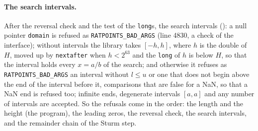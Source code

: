 \paragraph{The search intervals.} After the reversal check and the test of the \verb|long|s, the
search intervals (): a null pointer \verb|domain| is refused as
\verb|RATPOINTS_BAD_ARGS| (line 4830, a check of the interface); without intervals the library takes
$[-h, h]$, where $h$ is the double of $H$, moved up by \verb|nextafter| when $h < 2^{63}$ and the
\verb|long| of $h$ is below $H$, so that the interval holds every $x = a/b$ of the search; and
otherwise it refuses as \verb|RATPOINTS_BAD_ARGS| an interval without $l \le u$ or one that does not
begin above the end of the interval before it, comparisons that are false for a NaN, so that a NaN
end is refused too; infinite ends, degenerate intervals $[a, a]$ and any number of intervals are
accepted. So the refusals come in the order: the length and the height (the program), the leading
zeros, the reversal check, the search intervals, and the remainder chain of the Sturm step.

